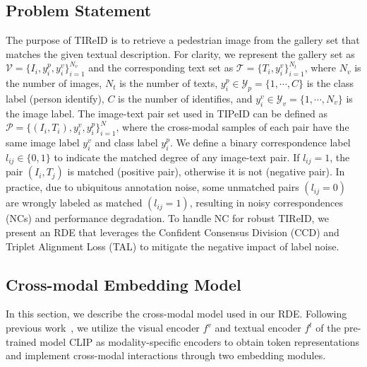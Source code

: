 \documentclass[10pt,twocolumn,letterpaper]{article}
\begin{document}
\subsection{Problem Statement}
The purpose of TIReID is to retrieve a pedestrian image from the gallery set that matches the given textual description. For clarity, we represent the gallery set as $\mathcal{V}=\{I_i,y^p_i,y^v_i\}^{N_v}_{i=1}$ and the corresponding text set as $\mathcal{T}=\{T_i,y^v_i\}^{N_t}_{i=1}$, where $N_v$ is the number of images, $N_t$ is the number of texts, $y^p_i\in\mathcal{Y}_p=\{1,\cdots,C\}$ is the class label (person identify), $C$ is the number of identifies, and $y^v_i\in\mathcal{Y}_v=\{1,\cdots,N_v\}$ is the image label. The image-text pair set used in TIPeID can be defined as $\mathcal{P}=\{(I_i,T_i), y^v_i, y^p_i\}^{N}_{i=1}$, where the cross-modal samples of each pair have the same image label $y_i^v$ and class label $y_i^p$. We define a binary correspondence label $l_{ij}\in\{0,1\}$ to indicate the matched degree of any image-text pair. If $l_{ij}=1$, the pair $(I_i,T_j)$ is matched (positive pair), otherwise it is not (negative pair). In practice, due to ubiquitous annotation noise, some unmatched pairs $(l_{ij}=0)$ are wrongly labeled as matched $(l_{ij}=1)$, resulting in noisy correspondences (NCs) and performance degradation. To handle NC for robust TIReID, we present an RDE that leverages the Confident Consensus Division (CCD) and Triplet Alignment Loss (TAL) to mitigate the negative impact of label noise.

\subsection{Cross-modal Embedding Model}
In this section, we describe the cross-modal model used in our RDE. Following previous work~\cite{jiang2023cross}, we utilize the visual encoder $f^v$ and textual encoder $f^t$ of the pre-trained model CLIP as modality-specific encoders to obtain token representations and implement cross-modal interactions through two embedding modules.
\end{document}
